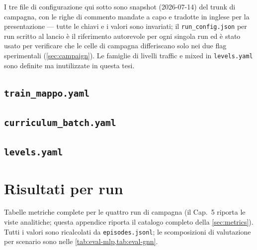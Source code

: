 I tre file di configurazione qui sotto sono snapshot (2026-07-14) del
trunk di campagna, con le righe di commento mandate a capo e tradotte
in inglese per la presentazione --- tutte le chiavi e i valori sono
invariati; il \texttt{run\_config.json} per run scritto al lancio è il
riferimento autorevole per ogni singola run ed è stato usato per
verificare che le celle di campagna differiscano solo nei due flag
sperimentali (\cref{sec:campaign}). Le famiglie di livelli traffic e
mixed in \texttt{levels.yaml} sono definite ma inutilizzate in questa
tesi.

\section*{\texttt{train\_mappo.yaml}}
{\scriptsize}

\section*{\texttt{curriculum\_batch.yaml}}
{\scriptsize}

\section*{\texttt{levels.yaml}}
{\scriptsize}

\chapter{Risultati per run}
\label{app:per-seed}

Tabelle metriche complete per le quattro run di campagna (il Cap.~5
riporta le viste analitiche; questa appendice riporta il catalogo
completo della \cref{sec:metrics}). Tutti i valori sono ricalcolati da
\texttt{episodes.jsonl}; le scomposizioni di valutazione per scenario
sono nelle \cref{tab:eval-mlp,tab:eval-gnn}.

